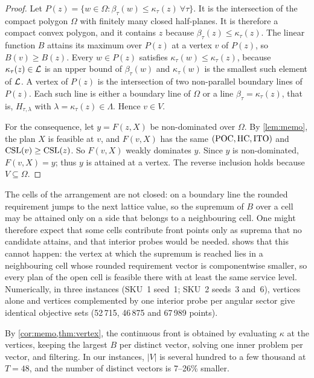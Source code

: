 \begin{proof}
  Let $P(z)=\{w\in\Omega : \beta_\tau(w)\le\kappa_\tau(z)\ \forall\tau\}$. It is the
  intersection of the compact polygon $\Omega$ with finitely many closed half-planes. It
  is therefore a compact convex polygon, and it contains $z$ because
  $\beta_\tau(z)\le\kappa_\tau(z)$. The linear function $B$ attains its maximum over
  $P(z)$ at a vertex $v$ of $P(z)$, so $B(v)\ge B(z)$. Every $w\in P(z)$ satisfies
  $\kappa_\tau(w)\le\kappa_\tau(z)$, because $\kappa_\tau(z)\in\mathcal{L}$ is an upper bound of
  $\beta_\tau(w)$ and $\kappa_\tau(w)$ is the smallest such element of $\mathcal{L}$. A vertex of
  $P(z)$ is the intersection of two non-parallel boundary lines of $P(z)$. Each such line
  is either a boundary line of $\Omega$ or a line $\beta_\tau=\kappa_\tau(z)$, that is,
  $H_{\tau,\lambda}$ with $\lambda=\kappa_\tau(z)\in\Lambda$. Hence $v\in V$.

  For the consequence, let $y=F(z,X)$ be non-dominated over $\Omega$. By
  \cref{lem:memo}, the plan $X$ is feasible at $v$, and $F(v,X)$ has the same
  $(\mathrm{POC},\mathrm{HC},\mathrm{ITO})$ and $\mathrm{CSL}(v)\ge\mathrm{CSL}(z)$. So $F(v,X)$ weakly dominates $y$. Since $y$
  is non-dominated, $F(v,X)=y$; thus $y$ is attained at a vertex. The reverse inclusion
  holds because $V\subseteq\Omega$.
\end{proof}

\begin{remark}
  The cells of the arrangement are not closed: on a boundary line the rounded requirement
  jumps to the next lattice value, so the supremum of $B$ over a cell may be attained only on
  a side that belongs to a neighbouring cell. One might therefore expect that some cells
  contribute front points only as suprema that no candidate attains, and that interior
  probes would be needed.  shows that this cannot happen: the vertex at
  which the supremum is reached lies in a neighbouring cell whose rounded requirement
  vector is componentwise smaller, so every plan of the open cell is feasible there with at
  least the same service level. Numerically, in three instances (SKU~1 seed~1; SKU~2 seeds~3
  and~6), vertices alone and vertices complemented by one interior probe per angular sector
  give identical objective sets (52\,715, 46\,875 and 67\,989 points).
\end{remark}

By \cref{cor:memo,thm:vertex}, the continuous front is obtained by evaluating $\kappa$ at
the vertices, keeping the largest $B$ per distinct vector, solving one inner problem per
vector, and filtering. In our instances, $\lvert V\rvert$ is several hundred to a few
thousand at $T=48$, and the number of distinct vectors is 7--26\% smaller.

